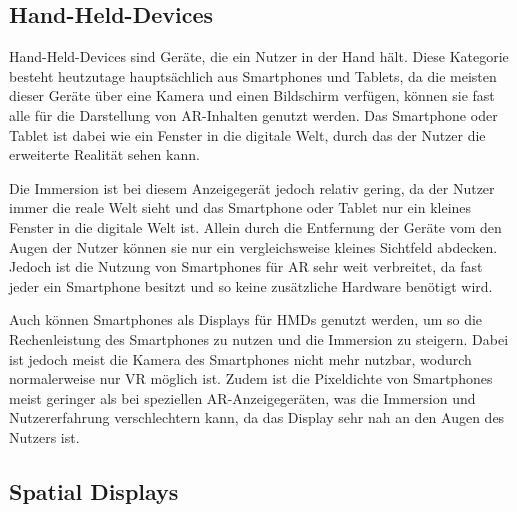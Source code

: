   \subsection{Hand-Held-Devices}

  Hand-Held-Devices sind Geräte, die ein Nutzer in der Hand hält.
  Diese Kategorie besteht heutzutage hauptsächlich aus Smartphones und Tablets, da die meisten dieser Geräte über eine Kamera und einen Bildschirm verfügen, können sie fast alle für die Darstellung von AR-Inhalten genutzt werden.
  Das Smartphone oder Tablet ist dabei wie ein Fenster in die digitale Welt, durch das der Nutzer die erweiterte Realität sehen kann.

  Die Immersion ist bei diesem Anzeigegerät jedoch relativ gering, da der Nutzer immer die reale Welt sieht und das Smartphone oder Tablet nur ein kleines Fenster in die digitale Welt ist.
  Allein durch die Entfernung der Geräte vom den Augen der Nutzer können sie nur ein vergleichsweise kleines Sichtfeld abdecken.
  Jedoch ist die Nutzung von Smartphones für AR sehr weit verbreitet, da fast jeder ein Smartphone besitzt und so keine zusätzliche Hardware benötigt wird.

  Auch können Smartphones als Displays für HMDs genutzt werden, um so die Rechenleistung des Smartphones zu nutzen und die Immersion zu steigern.
  Dabei ist jedoch meist die Kamera des Smartphones nicht mehr nutzbar, wodurch normalerweise nur VR möglich ist.
  Zudem ist die Pixeldichte von Smartphones meist geringer als bei speziellen AR-Anzeigegeräten, was die Immersion und Nutzererfahrung verschlechtern kann, da das Display sehr nah an den Augen des Nutzers ist.

  

  \subsection{Spatial Displays}